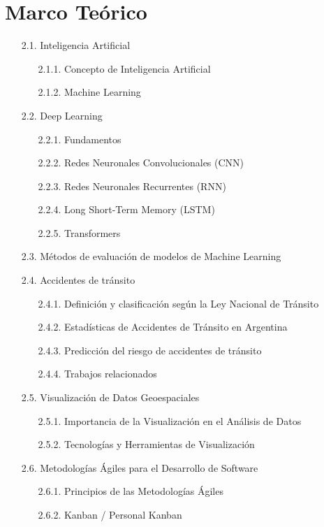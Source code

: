 \chapter{Marco Teórico}
\begin{itemize}
    \item[2.1.] Inteligencia Artificial
    \begin{itemize}
        \item[2.1.1.] Concepto de Inteligencia Artificial
        \item[2.1.2.] Machine Learning
    \end{itemize}
    \item[2.2.] Deep Learning
    \begin{itemize}
        \item[2.2.1.] Fundamentos
        \item[2.2.2.] Redes Neuronales Convolucionales (CNN)
        \item[2.2.3.] Redes Neuronales Recurrentes (RNN) 
        \item[2.2.4.] Long Short-Term Memory (LSTM)
        \item[2.2.5.] Transformers
    \end{itemize}
    \item[2.3.] Métodos de evaluación de modelos de Machine Learning
    \item[2.4.] Accidentes de tránsito
    \begin{itemize}
        \item[2.4.1.] Definición y clasificación según la Ley Nacional de Tránsito
        \item[2.4.2.] Estadísticas de Accidentes de Tránsito en Argentina
        \item[2.4.3.] Predicción del riesgo de accidentes de tránsito
        \item[2.4.4.] Trabajos relacionados
    \end{itemize}
    \item[2.5.] Visualización de Datos Geoespaciales
        \begin{itemize}
            \item[2.5.1.] Importancia de la Visualización en el Análisis de Datos
            \item[2.5.2.] Tecnologías y Herramientas de Visualización
        \end{itemize}
    \item[2.6.] Metodologías Ágiles para el Desarrollo de Software
    \begin{itemize}
        \item[2.6.1.] Principios de las Metodologías Ágiles
        \item[2.6.2.] Kanban / Personal Kanban
    \end{itemize}
\end{itemize}